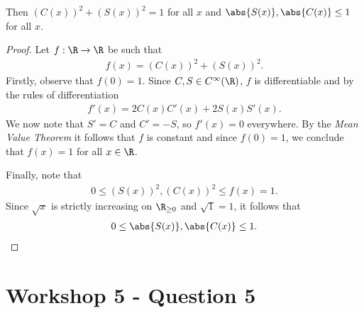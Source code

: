 \documentclass{article}
\begin{document}
\begin{claim*}
   Then $(C(x))^2 + (S(x))^2 = 1$ for all $x$ and $\abs{S(x)},\abs{C(x)}\leq 1$
   for all $x$.
\end{claim*}

\begin{proof}
   Let $f:\R\to\R$ be such that
   \begin{align*}
      f(x) = (C(x))^2 + (S(x))^2.
   \end{align*}
   Firstly, observe that $f(0)=1$.
   Since $C,S\in C^\infty(\R)$, $f$ is differentiable and by the rules of differentiation
   \begin{align*}
      f'(x) = 2C(x)C'(x) + 2S(x)S'(x).
   \end{align*}
   We now note that $S'=C$ and $C'=-S$, so $f'(x)=0$ everywhere. By the \emph{Mean Value Theorem}
   it follows that $f$ is constant and since $f(0)=1$, we conclude that $f(x)=1$ for all $x\in\R$.

   Finally, note that
   \begin{align*}
      0 \leq (S(x))^2, (C(x))^2 \leq f(x) = 1.
   \end{align*}
   Since $\sqrt{x}$ is strictly increasing on $\R_{\geq 0}$ and $\sqrt{1}=1$, it follows that
   \begin{align*}
      0 \leq \abs{S(x)}, \abs{C(x)} \leq 1.
   \end{align*}
\end{proof}

\section*{Workshop 5 - Question 5}
\end{document}
